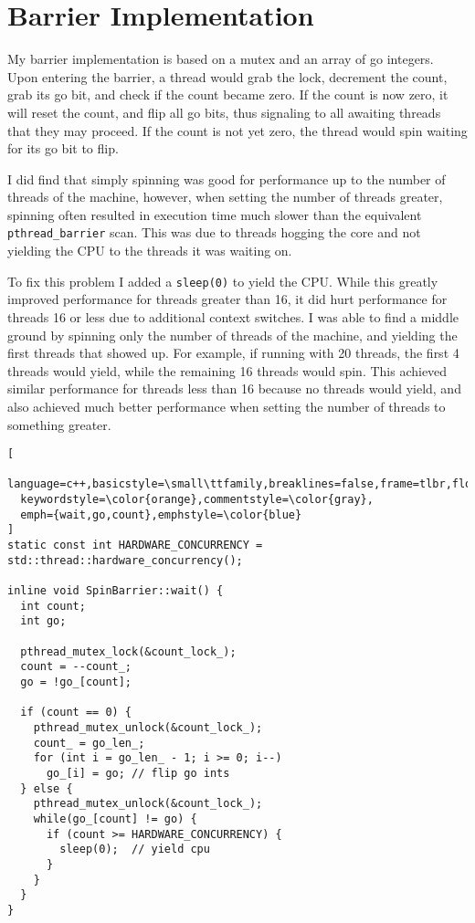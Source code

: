 \documentclass{article}
\begin{document}
\begin{center}
  
\end{center}

\section{Barrier Implementation}

My barrier implementation is based on a mutex and an array of go integers.
Upon entering the barrier, a thread would grab the lock, decrement the count,
grab its go bit, and check if the count became zero.
If the count is now zero, it will reset the count, and flip all go bits, thus
signaling to all awaiting threads that they may proceed.
If the count is not yet zero, the thread would spin waiting for its go bit to
flip.

I did find that simply spinning was good for performance up to the number of
threads of the machine, however, when setting the number of threads greater,
spinning often resulted in execution time much slower than the equivalent
\texttt{\small pthread\_barrier} scan.
This was due to threads hogging the core and not yielding the CPU to the
threads it was waiting on.

To fix this problem I added a \texttt{\small sleep(0)} to yield the CPU.
While this greatly improved performance for threads greater than 16, it did
hurt performance for threads 16 or less due to additional context switches.
I was able to find a middle ground by spinning only the number of threads of
the machine, and yielding the first threads that showed up.
For example, if running with 20 threads, the first 4 threads would yield, while
the remaining 16 threads would spin.
This achieved similar performance for threads less than 16 because no threads
would yield, and also achieved much better performance when setting the number
of threads to something greater.

\begin{lstlisting}[
  language=c++,basicstyle=\small\ttfamily,breaklines=false,frame=tlbr,float=htbp,
  keywordstyle=\color{orange},commentstyle=\color{gray},
  emph={wait,go,count},emphstyle=\color{blue}
]
static const int HARDWARE_CONCURRENCY = std::thread::hardware_concurrency();

inline void SpinBarrier::wait() {
  int count;
  int go;

  pthread_mutex_lock(&count_lock_);
  count = --count_;
  go = !go_[count];

  if (count == 0) {
    pthread_mutex_unlock(&count_lock_);
    count_ = go_len_;
    for (int i = go_len_ - 1; i >= 0; i--)
      go_[i] = go; // flip go ints
  } else {
    pthread_mutex_unlock(&count_lock_);
    while(go_[count] != go) {
      if (count >= HARDWARE_CONCURRENCY) {
        sleep(0);  // yield cpu
      }
    }
  }
}
\end{lstlisting}
\end{document}
